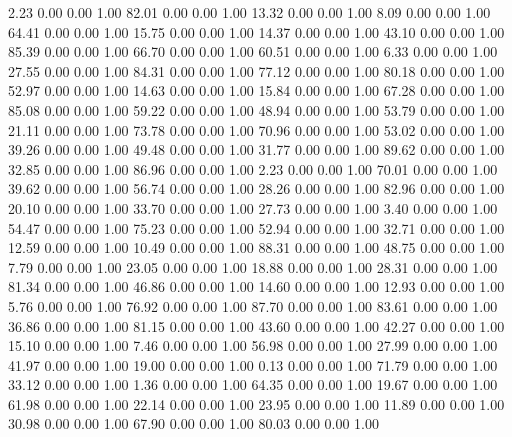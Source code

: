     2.23   0.00   0.00   1.00
   82.01   0.00   0.00   1.00
   13.32   0.00   0.00   1.00
    8.09   0.00   0.00   1.00
   64.41   0.00   0.00   1.00
   15.75   0.00   0.00   1.00
   14.37   0.00   0.00   1.00
   43.10   0.00   0.00   1.00
   85.39   0.00   0.00   1.00
   66.70   0.00   0.00   1.00
   60.51   0.00   0.00   1.00
    6.33   0.00   0.00   1.00
   27.55   0.00   0.00   1.00
   84.31   0.00   0.00   1.00
   77.12   0.00   0.00   1.00
   80.18   0.00   0.00   1.00
   52.97   0.00   0.00   1.00
   14.63   0.00   0.00   1.00
   15.84   0.00   0.00   1.00
   67.28   0.00   0.00   1.00
   85.08   0.00   0.00   1.00
   59.22   0.00   0.00   1.00
   48.94   0.00   0.00   1.00
   53.79   0.00   0.00   1.00
   21.11   0.00   0.00   1.00
   73.78   0.00   0.00   1.00
   70.96   0.00   0.00   1.00
   53.02   0.00   0.00   1.00
   39.26   0.00   0.00   1.00
   49.48   0.00   0.00   1.00
   31.77   0.00   0.00   1.00
   89.62   0.00   0.00   1.00
   32.85   0.00   0.00   1.00
   86.96   0.00   0.00   1.00
    2.23   0.00   0.00   1.00
   70.01   0.00   0.00   1.00
   39.62   0.00   0.00   1.00
   56.74   0.00   0.00   1.00
   28.26   0.00   0.00   1.00
   82.96   0.00   0.00   1.00
   20.10   0.00   0.00   1.00
   33.70   0.00   0.00   1.00
   27.73   0.00   0.00   1.00
    3.40   0.00   0.00   1.00
   54.47   0.00   0.00   1.00
   75.23   0.00   0.00   1.00
   52.94   0.00   0.00   1.00
   32.71   0.00   0.00   1.00
   12.59   0.00   0.00   1.00
   10.49   0.00   0.00   1.00
   88.31   0.00   0.00   1.00
   48.75   0.00   0.00   1.00
    7.79   0.00   0.00   1.00
   23.05   0.00   0.00   1.00
   18.88   0.00   0.00   1.00
   28.31   0.00   0.00   1.00
   81.34   0.00   0.00   1.00
   46.86   0.00   0.00   1.00
   14.60   0.00   0.00   1.00
   12.93   0.00   0.00   1.00
    5.76   0.00   0.00   1.00
   76.92   0.00   0.00   1.00
   87.70   0.00   0.00   1.00
   83.61   0.00   0.00   1.00
   36.86   0.00   0.00   1.00
   81.15   0.00   0.00   1.00
   43.60   0.00   0.00   1.00
   42.27   0.00   0.00   1.00
   15.10   0.00   0.00   1.00
    7.46   0.00   0.00   1.00
   56.98   0.00   0.00   1.00
   27.99   0.00   0.00   1.00
   41.97   0.00   0.00   1.00
   19.00   0.00   0.00   1.00
    0.13   0.00   0.00   1.00
   71.79   0.00   0.00   1.00
   33.12   0.00   0.00   1.00
    1.36   0.00   0.00   1.00
   64.35   0.00   0.00   1.00
   19.67   0.00   0.00   1.00
   61.98   0.00   0.00   1.00
   22.14   0.00   0.00   1.00
   23.95   0.00   0.00   1.00
   11.89   0.00   0.00   1.00
   30.98   0.00   0.00   1.00
   67.90   0.00   0.00   1.00
   80.03   0.00   0.00   1.00
